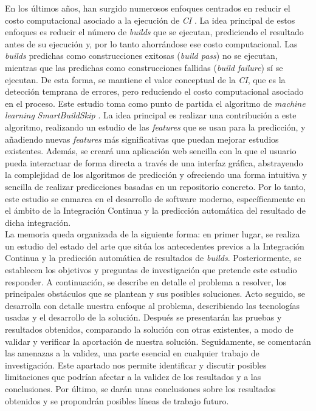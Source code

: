 En los últimos años, han surgido numerosos enfoques centrados en reducir el costo computacional
asociado a la ejecución de \textit{CI} \cite{1,2,4,5,6,7}. La idea principal de estos enfoques es
reducir el número de \textit{builds} que se ejecutan, prediciendo el resultado antes de su
ejecución y, por lo tanto ahorrándose ese costo computacional. Las \textit{builds} predichas como
construcciones exitosas (\textit{build pass}) no se ejecutan, mientras que las predichas como
construcciones fallidas (\textit{build failure}) sí se ejecutan. De esta forma, se mantiene el
valor conceptual de la \textit{CI}, que es la detección temprana de errores, pero reduciendo
el costo computacional asociado en el proceso. Este estudio toma como punto de partida el
algoritmo de \textit{machine learning} \textit{SmartBuildSkip} \cite{2}. La idea principal es
realizar una contribución a este algoritmo, realizando un estudio de las \textit{features} que
se usan para la predicción, y añadiendo nuevas \textit{features} más significativas que puedan
mejorar estudios existentes. Además, se creará una aplicación web sencilla con la que el usuario
pueda interactuar de forma directa a través de una interfaz gráfica, abstrayendo la complejidad
de los algoritmos de predicción y ofreciendo una forma intuitiva y sencilla de realizar
predicciones basadas en un repositorio concreto. Por lo tanto, este estudio se enmarca en el
desarrollo de software moderno, específicamente en el ámbito de la Integración Continua y la
predicción automática del resultado de dicha integración.\\

La memoria queda organizada de la siguiente forma: en primer lugar, se realiza un estudio del
estado del arte que sitúa los antecedentes previos a la Integración Continua y la predicción
automática de resultados de \textit{builds}. Posteriormente, se establecen los objetivos y
preguntas de investigación que pretende este estudio responder. A continuación, se describe
en detalle el problema a resolver, los principales obstáculos que se plantean y sus posibles
soluciones. Acto seguido, se desarrolla con detalle nuestra enfoque al problema, describiendo
las tecnologías usadas y el desarrollo de la solución. Después se presentarán las pruebas y
resultados obtenidos, comparando la solución con otras existentes, a modo de validar y verificar
la aportación de nuestra solución. Seguidamente, se comentarán las amenazas a la validez, una
parte esencial en cualquier trabajo de investigación. Este apartado nos permite identificar y
discutir posibles limitaciones que podrían afectar a la validez de los resultados y a las
conclusiones. Por último, se darán unas conclusiones sobre los resultados obtenidos y se
propondrán posibles líneas de trabajo futuro.
